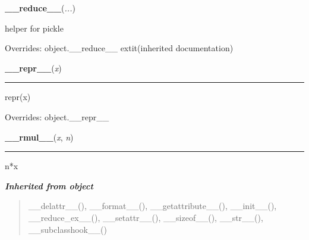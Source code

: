     \vspace{0.5ex}

\hspace{.8\funcindent}\begin{boxedminipage}{\funcwidth}

    \raggedright \textbf{\_\_reduce\_\_}(\textit{...})

\setlength{\parskip}{2ex}
    helper for pickle

\setlength{\parskip}{1ex}
      Overrides: object.\_\_reduce\_\_ 	extit{(inherited documentation)}

    \end{boxedminipage}

    \vspace{0.5ex}

\hspace{.8\funcindent}\begin{boxedminipage}{\funcwidth}

    \raggedright \textbf{\_\_repr\_\_}(\textit{x})

    \vspace{-1.5ex}

    \rule{\textwidth}{0.5\fboxrule}
\setlength{\parskip}{2ex}
    repr(x)

\setlength{\parskip}{1ex}
      Overrides: object.\_\_repr\_\_

    \end{boxedminipage}

    \label{posix:statvfs_result:__rmul__}

    \vspace{0.5ex}

\hspace{.8\funcindent}\begin{boxedminipage}{\funcwidth}

    \raggedright \textbf{\_\_rmul\_\_}(\textit{x}, \textit{n})

    \vspace{-1.5ex}

    \rule{\textwidth}{0.5\fboxrule}
\setlength{\parskip}{2ex}
    n*x

\setlength{\parskip}{1ex}
    \end{boxedminipage}


\large{\textbf{\textit{Inherited from object}}}

\begin{quote}
\_\_delattr\_\_(), \_\_format\_\_(), \_\_getattribute\_\_(), \_\_init\_\_(), \_\_reduce\_ex\_\_(), \_\_setattr\_\_(), \_\_sizeof\_\_(), \_\_str\_\_(), \_\_subclasshook\_\_()
\end{quote}

